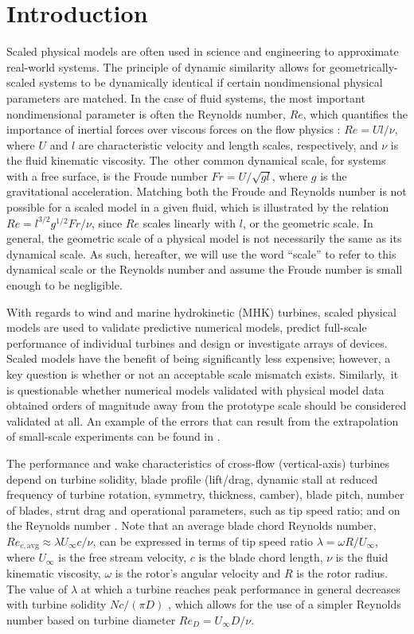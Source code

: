 \documentclass[energies,article,accept,moreauthors,pdftex,10pt,a4paper]{mdpi}
\theoremstyle{mdpi}
\newcounter{ex}
\newcounter{re}
\begin{document}
\section{Introduction}

Scaled physical models are often used in science and engineering to approximate
real-world systems. The principle of dynamic similarity allows for
geometrically-scaled systems to be dynamically identical if certain
nondimensional physical parameters are matched. In the case of fluid systems,
the most important nondimensional parameter is often the Reynolds number, $Re$,
which quantifies the importance of inertial forces over viscous forces on the
flow physics \cite{Acheson1990}: $Re = Ul/\nu$, where $U$ and $l$ are
characteristic velocity and length scales, respectively, and $\nu$ is the fluid
kinematic viscosity. The~other common dynamical scale, for systems with a free
surface, is the Froude number $Fr = U/\sqrt{gl}$, where $g$ is the gravitational
acceleration. Matching both the Froude and Reynolds number is not possible for a
scaled model in a given fluid, which is illustrated by the relation $Re =
l^{3/2} g^{1/2} Fr / \nu$, since $Re$ scales linearly with $l$, or the geometric
scale. In general, the geometric scale of a physical model is not necessarily
the same as its dynamical scale. As such, hereafter, we will use the word
``scale'' to refer to this dynamical scale or the Reynolds number and assume the
Froude number is small enough to be negligible.

With regards to wind and marine hydrokinetic (MHK) turbines, scaled physical
models are used to validate predictive numerical models, predict full-scale
performance of individual turbines and design or investigate arrays of devices.
Scaled models have the benefit of being significantly less expensive; however, a
key question is whether or not an acceptable scale mismatch exists. Similarly,~it is questionable whether numerical models validated with physical model data
obtained orders of magnitude away from the prototype scale should be considered
validated at all. An example of the errors that can result from the
extrapolation of small-scale experiments can be found in \cite{Baker1991}.

The performance and wake characteristics of cross-flow (vertical-axis) turbines
depend on turbine solidity, blade profile (lift/drag, dynamic stall at reduced
frequency of turbine rotation, symmetry, thickness, camber), blade pitch, number
of blades, strut drag and operational parameters, such as tip speed ratio; and
on the Reynolds number \cite{Para2002}. Note that an average blade chord
Reynolds number, $Re_{c,\mathrm{avg}} \approx \lambda U_\infty c/ \nu$, can be
expressed in terms of tip speed ratio $\lambda = \omega R/ U_\infty$, where
$U_\infty$ is the free stream velocity, $c$ is the blade chord length, $\nu$ is
the fluid kinematic viscosity, $\omega$ is the rotor's angular velocity and $R$
is the rotor radius. The value of $\lambda$ at which a turbine reaches peak
performance in general decreases with turbine solidity $Nc/(\pi D)$
\cite{Templin1974}, which allows for the use of a simpler Reynolds number based
on turbine diameter $Re_D = U_\infty D/\nu$.
\end{document}
